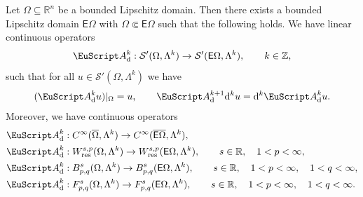 \documentclass[10pt,a4paper]{amsart}
\theoremstyle{definition}
\theoremstyle{remark}
\numberwithin{equation}{section}
\newcommand{\bbR}{{\mathbb R}}
\newcommand{\bbZ}{{\mathbb Z}}
\newcommand{\calS}{{\mathcal S}}
\newcommand{\euA}{{\EuScript A}}
\newcommand{\sfE}{{\mathsf E}}
\newcommand{\closure}{\overline}
\renewcommand{\restriction}{|}
\newcommand{\cartan}{{\mathrm d}}
\newcommand{\Domain}{{\Omega}}
\newcommand{\extDomain}{{\sfE\Omega}}
\newcommand{\Alt}[1]{\Lambda^{#1}}
\newcommand{\kommErweiterung}{\euA_{\cartan}}
\newcommand{\Wres}{W_{\mathrm{res}}}
\begin{document}
\begin{theorem}\label{theorem:commuting-universal-extension}
    Let $\Domain \subseteq \bbR^{n}$ be a bounded Lipschitz domain. Then there exists a bounded Lipschitz domain $\extDomain$ with $\Domain \Subset \extDomain$ such that the following holds.
    We have linear continuous operators 
    \begin{align}\label{math:commuting-universal-extension}
        \kommErweiterung^{k} : 
        \calS'(\Domain,\Alt{k})
        \to 
        \calS'(\extDomain,\Alt{k})
        ,
        \qquad 
        k \in \bbZ
        ,
    \end{align}
    such that for all $u \in \calS'(\Domain,\Alt{k})$ we have 
    \begin{align*}
        ( \kommErweiterung^{k} u) \restriction_{\Domain} = u,
        \qquad 
        \kommErweiterung^{k+1} \cartan^{k} u = \cartan^{k} \kommErweiterung^{k} u
        .
    \end{align*}
    Moreover, we have continuous operators 
    \begin{align}\label{math:commuting-universal-extension:smooth}
        &
        \kommErweiterung^{k} : C^{\infty}(\closure\Domain,\Alt{k}) \to C^{\infty}(\closure\extDomain,\Alt{k})
        ,
        \\
        &
        \kommErweiterung^{k} : \Wres^{s,p}(\Domain,\Alt{k}) \to \Wres^{s,p}(\extDomain,\Alt{k}), 
        \qquad 
        s \in \bbR, \quad 1 < p < \infty \label{math:commuting-universal-extension:sobolev}
        ,
        \\
        &
        \kommErweiterung^{k} : B^{s}_{p,q}(\Domain,\Alt{k}) \to B^{s}_{p,q}(\extDomain,\Alt{k}),
        \qquad
        s \in \bbR, \quad 1 < p < \infty, \quad 1 < q < \infty \label{math:commuting-universal-extension:besov}
        ,
        \\
        &
        \kommErweiterung^{k} : F^{s}_{p,q}(\Domain,\Alt{k}) \to F^{s}_{p,q}(\extDomain,\Alt{k}),
        \qquad
        s \in \bbR, \quad 1 < p < \infty, \quad 1 < q < \infty \label{math:commuting-universal-extension:triebellizorkin}
        .
    \end{align}
\end{theorem}
\end{document}
